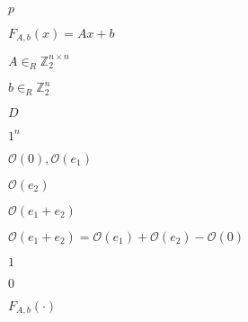 \documentclass[10pt]{book}
\begin{document}
\begin{mdSnippets}
\begin{mdInlineSnippet}[83878c91171338902e0fe0fb97a8c47a]
$p$\end{mdInlineSnippet}%
\begin{mdInlineSnippet}[935f02eb1b4b0196974be1dd8069fc7e]%
$F_{A,b}(x) = Ax + b$\end{mdInlineSnippet}%
\begin{mdInlineSnippet}[b8ba21e25b686f6c92202f098554c6af]%
$A \in_R \mathbb{Z}_2^{n \times n}$\end{mdInlineSnippet}%
\begin{mdInlineSnippet}[d21a2d82f230e7031b0d500b1839ec97]%
$b \in_R \mathbb{Z}_2^n$\end{mdInlineSnippet}%
\begin{mdInlineSnippet}[f623e75af30e62bbd73d6df5b50bb7b5]%
$D$\end{mdInlineSnippet}%
\begin{mdInlineSnippet}%
$1^n$\end{mdInlineSnippet}%
\begin{mdInlineSnippet}[ff6f0dcbba6c07a16f12d92f7c9b6e77]%
$\mathcal{O}(0), \mathcal{O}(e_1)$\end{mdInlineSnippet}%
\begin{mdInlineSnippet}[33a40b73e53bf010e244f023c8151dd7]%
$\mathcal{O}(e_2)$\end{mdInlineSnippet}%
\begin{mdInlineSnippet}[310224b5cd259d402f6d211ca566101b]%
$\mathcal{O}(e_1 + e_2)$\end{mdInlineSnippet}%
\begin{mdInlineSnippet}[e12ed5a37f86f0c40d95c0622ab6d08f]%
$\mathcal{O}(e_1 + e_2) = \mathcal{O}(e_1) + \mathcal{O}(e_2) - \mathcal{O}(0)$\end{mdInlineSnippet}%
\begin{mdInlineSnippet}[c4ca4238a0b923820dcc509a6f75849b]%
$1$\end{mdInlineSnippet}%
\begin{mdInlineSnippet}%
$0$\end{mdInlineSnippet}%
\begin{mdInlineSnippet}[b53f2afc904f2e1380454f93c20f10d5]%
$F_{A,b}(\cdot)$\end{mdInlineSnippet}%

\end{mdSnippets}
\end{document}
